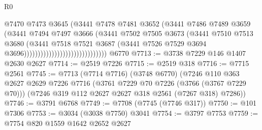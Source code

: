 \begin{lexlean}{R0}
\begin{coremodule}
                                                  @7470
                                                  @7473
                                                  @3645
                                                  (@3441
                                                    @7478
                                                    @7481
                                                    @3652
                                                    (@3441
                                                      @7486
                                                      @7489
                                                      @3659
                                                      (@3441
                                                        @7494
                                                        @7497
                                                        @3666
                                                        (@3441
                                                          @7502
                                                          @7505
                                                          @3673
                                                          (@3441
                                                            @7510
                                                            @7513
                                                            @3680
                                                            (@3441
                                                              @7518
                                                              @7521
                                                              @3687
                                                              (@3441
                                                                @7526
                                                                @7529
                                                                @3694
                                                                @3696))))))))))))))))))))))))))))))
    @6770
@7713 := @3738 @7229 @146 @1407 @2630 @2627
@7714 := @2519 @7226
@7715 := @2519 @318
@7716 := @7715 @2561
@7745 := @7713
    (@7714 @7716)
    (@3748 @6770)
    (@7246
      @110
      @363
      @2627
      @2629
      @7226
      @7716
      (@3761 @7229 @70 @7226 (@3766 (@3767 @7229 @70)))
      (@7246 @319 @112 @2627 @2627 @318 @2561 (@7267 @318) @7286))
@7746 := @3791 @6768
@7749 := @7708 (@7745 (@7746 @317))
@7750 := @101 @7306
@7753 := @3034 (@3038 @7750) @3041
@7754 := @3797 @7753
@7759 := @7754 @820 @1559 @1642 @2652 @2627

\end{coremodule}
\end{lexlean}
